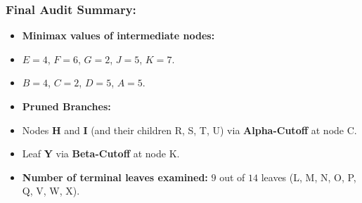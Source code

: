 \subsubsection{Final Audit Summary:}
\begin{itemize}
  \item   \textbf{Minimax values of intermediate nodes:}
  \item   $E = 4$, $F = 6$, $G = 2$, $J = 5$, $K = 7$.
  \item   $B = 4$, $C = 2$, $D = 5$, $A = 5$.
  \item   \textbf{Pruned Branches:}
  \item   Nodes \textbf{H} and \textbf{I} (and their children R, S, T, U) via \textbf{Alpha-Cutoff} at node C.
  \item   Leaf \textbf{Y} via \textbf{Beta-Cutoff} at node K.
  \item   \textbf{Number of terminal leaves examined:} $9$ out of $14$ leaves (L, M, N, O, P, Q, V, W, X).
\end{itemize}
